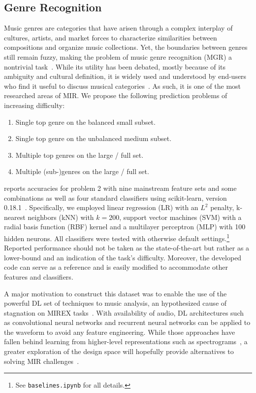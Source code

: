 \documentclass{article}
\begin{document}
\subsection{Genre Recognition} %

Music genres are categories that have arisen through a complex interplay of cultures, artists, and market forces to characterize similarities between compositions and organize music collections. Yet, the boundaries between genres still remain fuzzy, making the problem of music genre recognition (MGR) a nontrivial task~\cite{mir_review_genre}.
While its utility has been debated, mostly because of its ambiguity and cultural definition, it is widely used and understood by end-users who find it useful to discuss musical categories~\cite{mgr_why}.
As such, it is one of the most researched areas of MIR.
We propose the following prediction problems of increasing difficulty:
\begin{enumerate}
	\item Single top genre on the balanced small subset.
	\item Single top genre on the unbalanced medium subset.
	\item Multiple top genres on the large / full set.
	\item Multiple (sub-)genres on the large / full set.
\end{enumerate}

 reports accuracies for problem 2 with nine mainstream feature sets and some combinations as well as four standard classifiers using scikit-learn, version 0.18.1~\cite{scikit-learn}. Specifically, we employed linear regression (LR) with an $L^2$ penalty, k-nearest neighbors (kNN) with $k=200$, support vector machines (SVM) with a radial basis function (RBF) kernel and a multilayer perceptron (MLP) with 100 hidden neurons. All classifiers were tested with otherwise default settings.\footnote{See \texttt{baselines.ipynb} for all details.} Reported performance should not be taken as the state-of-the-art but rather as a lower-bound and an indication of the task's difficulty. Moreover, the developed code can serve as a reference and is easily modified to accommodate other features and classifiers.

A major motivation to construct this dataset was to enable the use of the powerful DL set of techniques to music analysis, an hypothesized cause of stagnation on MIREX tasks~\cite{mirex_stagnation}.
With availability of audio, DL architectures such as convolutional neural networks and recurrent neural networks can be applied to the waveform to avoid any feature engineering. While those approaches have fallen behind learning from higher-level representations such as spectrograms~\cite{dieleman_endtoend}, a greater exploration of the design space will hopefully provide alternatives to solving MIR challenges~\cite{mir_dl_feature_learning}.
\end{document}
